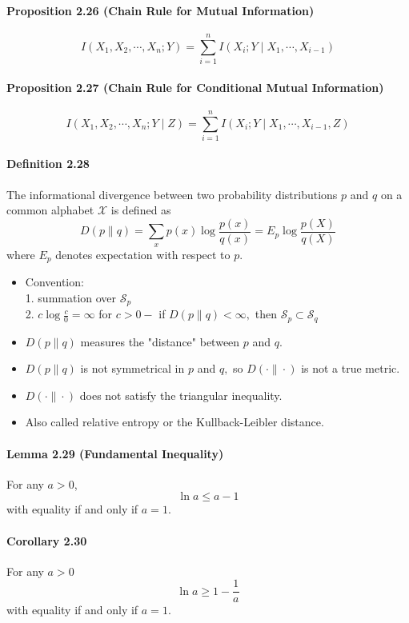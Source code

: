 \documentclass[8pt]{article}
\begin{document}
\paragraph{Proposition 2.26 (Chain Rule for Mutual Information)}
$$
I\left(X_{1}, X_{2}, \cdots, X_{n} ; Y\right)=\sum_{i=1}^{n} I\left(X_{i} ; Y \mid X_{1}, \cdots, X_{i-1}\right)
$$
\paragraph{Proposition 2.27 (Chain Rule for Conditional Mutual Information)}
$$
I\left(X_{1}, X_{2}, \cdots, X_{n} ; Y \mid Z\right)=\sum_{i=1}^{n} I\left(X_{i} ; Y \mid X_{1}, \cdots, X_{i-1}, Z\right)
$$

\paragraph{Definition 2.28} The informational divergence between two probability distributions $p$ and $q$ on a common alphabet $\mathcal{X}$ is defined as
$$
D(p \| q)=\sum_{x} p(x) \log \frac{p(x)}{q(x)}=E_{p} \log \frac{p(X)}{q(X)}
$$
where $E_{p}$ denotes expectation with respect to $p$.
\begin{itemize}
	\item Convention: \\
	1. summation over $\mathcal{S}_{p}$\\
	2. $c \log \frac{c}{0}=\infty$ for $c>0-$ if $D(p \| q)<\infty,$ then $\mathcal{S}_{p} \subset \mathcal{S}_{q}$
	\item $D(p \| q)$ measures the "distance" between $p$ and $q$.
	\item $D(p \| q)$ is not symmetrical in $p$ and $q,$ so $D(\cdot \| \cdot)$ is not a true metric.
	\item $D(\cdot \| \cdot)$ does not satisfy the triangular inequality.
	\item Also called relative entropy or the Kullback-Leibler distance.
\end{itemize}
\paragraph{Lemma 2.29 (Fundamental Inequality)} For any $a>0$,
$$
\ln a \leq a-1
$$
with equality if and only if $a=1$.
\paragraph{Corollary 2.30} For any $a>0$
$$
\ln a \geq 1-\frac{1}{a}
$$
with equality if and only if $a=1$.
\end{document}
